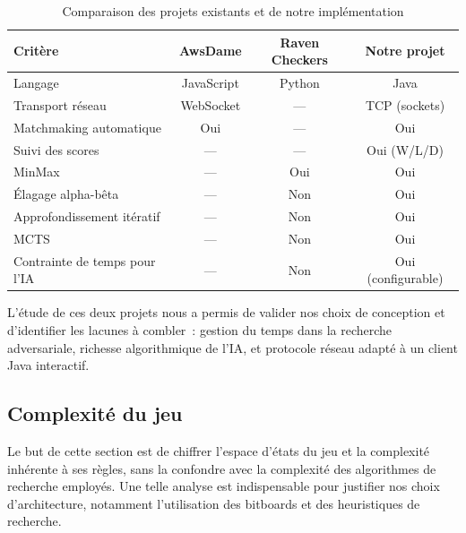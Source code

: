 \documentclass[a4paper]{article}
\begin{document}
\begin{table}[h]
  \centering
  \caption{Comparaison des projets existants et de notre implémentation}
  \label{tab:comparaison}
  \renewcommand{\arraystretch}{1.3}
  \begin{tabular}{|l|c|c|c|}
    \hline
    \textbf{Critère}               & \textbf{AwsDame} & \textbf{Raven Checkers} & \textbf{Notre projet} \\
    \hline
    Langage                        & JavaScript       & Python                  & Java                  \\
    \hline
    Transport réseau               & WebSocket        & —                       & TCP (sockets)         \\
    \hline
    Matchmaking automatique        & Oui              & —                       & Oui                   \\
    \hline
    Suivi des scores               & —                & —                       & Oui (W/L/D)           \\
    \hline
    MinMax                         & —                & Oui                     & Oui                   \\
    \hline
    Élagage alpha-bêta             & —                & Non                     & Oui                   \\
    \hline
    Approfondissement itératif     & —                & Non                     & Oui                   \\
    \hline
    MCTS                           & —                & Non                     & Oui                   \\
    \hline
    Contrainte de temps pour l'IA  & —                & Non                     & Oui (configurable)    \\
    \hline
  \end{tabular}
\end{table}

L'étude de ces deux projets nous a permis de valider nos choix de conception
et d'identifier les lacunes à combler~: gestion du temps dans la recherche
adversariale, richesse algorithmique de l'IA, et protocole réseau adapté
à un client Java interactif.

\subsection{Complexité du jeu}

Le but de cette section est de chiffrer l'espace d'états du jeu et la complexité inhérente à ses règles, sans la confondre avec la 
complexité des algorithmes de recherche employés. Une telle analyse est indispensable pour justifier nos choix d'architecture, notamment 
l'utilisation des bitboards et des heuristiques de recherche.
\end{document}
